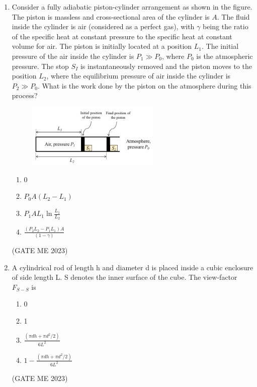 \documentclass[journal]{IEEEtran}
\begin{document}
\begin{enumerate}
\item Consider a fully adiabatic piston-cylinder arrangement as shown in the figure. The piston is massless and cross-sectional area of the cylinder is $ A $. The fluid inside the cylinder is air (considered as a perfect gas), with $ \gamma $ being the ratio of the specific heat at constant pressure to the specific heat at constant volume for air. The piston is initially located at a position $ L_1 $. The initial pressure of the air inside the cylinder is $ P_1 \gg P_0 $, where $ P_0 $ is the atmospheric pressure. The stop $ S_I $ is instantaneously removed and the piston moves to the position $ L_2 $, where the equilibrium pressure of air inside the cylinder is $ P_2 \gg P_0 $. What is the work done by the piston on the atmosphere during this process?
\begin{figure}[H]
\centering
\includegraphics[width=0.6\textwidth]{Fig 41.png}
\caption{}
\label{fig:question42}
\end{figure}

\begin{enumerate}
    \item 0
    \item $ P_0 A(L_2 - L_1) $
    \item $ P_1 A L_1 \ln \frac{L_1}{L_2} $
    \item $ \frac{(P_2 L_2 - P_1 L_1) A}{(1 - \gamma)} $
\end{enumerate}
\hfill (GATE ME 2023)

\item A cylindrical rod of length h and diameter d is placed inside a cubic enclosure of side length L. S denotes the inner surface of the cube. The view-factor $ F_{S-S} $ is

\begin{enumerate}
    \item 0
    \item 1
    \item $ \frac{(\pi d h + \pi d^2/2)}{6L^2} $
    \item $ 1 - \frac{(\pi d h + \pi d^2/2)}{6L^2} $
\end{enumerate}
\hfill (GATE ME 2023)


\end{enumerate}
\end{document}
